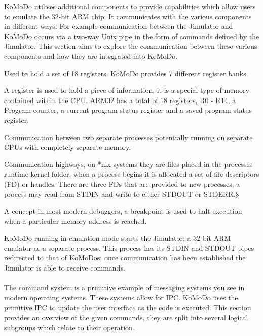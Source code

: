 KoMoDo utilises additional components to provide capabilities which allow users to emulate the 32-bit ARM chip. It communicates with the various components in different ways. For example communication between the Jimulator and KoMoDo occurs via a two-way Unix pipe in the form of commands defined by the Jimulator. This section aims to explore the communication between these various components and how they are integrated into KoMoDo. 

  \begin{description}[leftmargin=!,labelwidth=\widthof{\bfseries \footnotesize inter process communication}]
    \item[\footnotesize Register bank] Used to hold a set of 18 registers. KoMoDo provides 7 different register banks.
    \item[\footnotesize Register] A register is used to hold a piece of information, it is a special type of memory contained within the CPU. ARM32 has a total of 18 registers, R0 - R14, a Program counter, a current program status register and a saved program status register.
    \item[\footnotesize Inter process communication] Communication between two separate processes potentially running on separate CPUs with completely separate memory.
    \item[\footnotesize (*nix) pipes] Communication highways, on *nix systems they are files placed in the processes runtime kernel folder, when a process begins it is allocated a set of file descriptors (FD) or handles. There are three FDs that are provided to new processes; a process may read from STDIN and write to  either STDOUT or STDERR.§
    \item[\footnotesize breakpoint] A concept in most modern debuggers, a breakpoint is used to halt execution when a particular memory address is reached.
  \end{description}
%
KoMoDo running in emulation mode starts the Jimulator; a 32-bit ARM emulator as a separate process. This process has its STDIN and STDOUT pipes redirected to that of KoMoDos; once communication has been established the Jimulator is able to receive commands.\\\\
%
The command system is a primitive example of messaging systems you see in modern operating systems. These systems allow for IPC. KoMoDo uses the primitive IPC to update the user interface as the code is executed. This section provides an overview of the given commands, they are split into several logical subgroups which relate to their operation.
